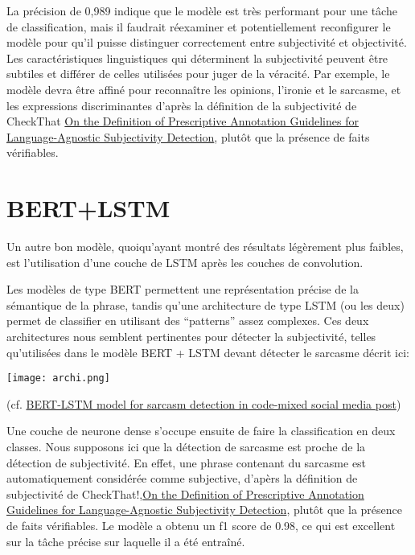 \documentclass[11pt]{rapport_class}
\begin{document}
La précision de 0,989 indique que le modèle est très performant pour une tâche de classification, mais il faudrait réexaminer et potentiellement reconfigurer le modèle pour qu'il puisse distinguer correctement entre subjectivité et objectivité. Les caractéristiques linguistiques qui déterminent la subjectivité peuvent être subtiles et différer de celles utilisées pour juger de la véracité. Par exemple, le modèle devra être affiné pour reconnaître les opinions, l’ironie et le sarcasme, et les expressions discriminantes d'après la définition de la subjectivité de CheckThat \href{https://ceur-ws.org/Vol-3370/paper10.pdf}{On the Definition of Prescriptive Annotation
Guidelines for Language-Agnostic Subjectivity
Detection}, plutôt que la présence de faits vérifiables.

\section{BERT+LSTM}
\qquad Un autre bon modèle, quoiqu'ayant montré des résultats légèrement plus faibles, est l'utilisation d'une couche de LSTM après les couches de convolution.
\vspace{0mm}

Les modèles de type BERT permettent une représentation précise de la sémantique de la phrase, tandis qu'une architecture de type LSTM (ou les deux) permet de classifier en utilisant des “patterns” assez complexes. Ces deux architectures nous semblent pertinentes pour détecter la subjectivité, telles qu'utilisées dans le modèle BERT + LSTM devant détecter le sarcasme décrit ici:

\begin{center}
    \texttt{[image: archi.png]}\\
    \begin{tiny}
        (cf. \href{https://link-springer-com.gorgone.univ-toulouse.fr/article/10.1007/s10844-022-00755-z}{BERT-LSTM model for sarcasm detection in code-mixed social media post})\\
        \vspace{0mm}
    \end{tiny}
\end{center}

\qquad Une couche de neurone dense s’occupe ensuite de faire la classification en deux classes. Nous supposons ici que la détection de sarcasme est proche de la détection de subjectivité. En effet, une phrase contenant du sarcasme est automatiquement considérée comme subjective, d'apèrs la définition de subjectivité de CheckThat!,\href{https://ceur-ws.org/Vol-3370/paper10.pdf}{On the Definition of Prescriptive Annotation
Guidelines for Language-Agnostic Subjectivity
Detection}, plutôt que la présence de faits vérifiables. Le modèle a obtenu un f1 score de 0.98, ce qui est excellent sur la tâche précise sur laquelle il a été entraîné. 
\end{document}
